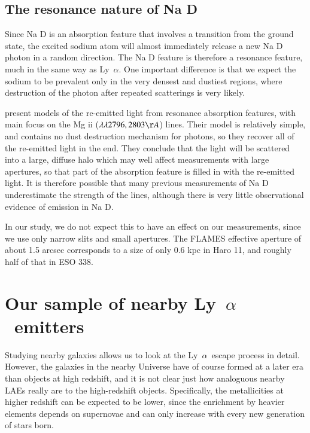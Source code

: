 \documentclass[a4wide,12pt]{book}
\newcommand{\lya}{Ly~${\alpha}$}
\begin{document}
{\section{The resonance nature of Na D}\label{Sec:NaDresonance}

Since Na D is an absorption feature that involves a transition from the ground state, the excited sodium atom will almost immediately release a new Na D photon in a random direction. The Na D feature is therefore a resonance feature, much in the same way as \lya . One important difference is that we expect the sodium to be prevalent only in the very densest and dustiest regions, where destruction of the photon after repeated scatterings is very likely. 

\citet{prochaska-2011} present models of the re-emitted light from resonance absorption features, with main focus on the Mg {\sc ii} ($\lambda \lambda 2796, 2803 \AA$) lines. Their model is relatively simple, and contains no dust destruction mechanism for photons, so they recover all of the re-emitted light in the end. They conclude that the light will be scattered into a large, diffuse halo which may well affect measurements with large apertures, so that part of the absorption feature is filled in with the re-emitted light. It is therefore possible that many previous measurements of Na D underestimate the strength of the lines, although there is very little observational evidence of emission in Na D. 

In our study, we do not expect this to have an effect on our measurements, since we use only narrow slits and small apertures. The FLAMES effective aperture of about 1.5 arcsec corresponds to a size of only 0.6 kpc in Haro 11, and roughly half of that in ESO 338. 


\chapter{Our sample of nearby \lya\ emitters} %

Studying nearby galaxies allows us to look at the \lya\ escape process in detail. However, the galaxies in the nearby Universe have of course formed at a later era than objects at high redshift, and it is not clear just how analoguous nearby LAEs really are to the high-redshift objects. Specifically, the metallicities at higher redshift can be expected to be lower, since the enrichment by heavier elements depends on supernovae and can only increase with every new generation of stars born. 

}
\end{document}
